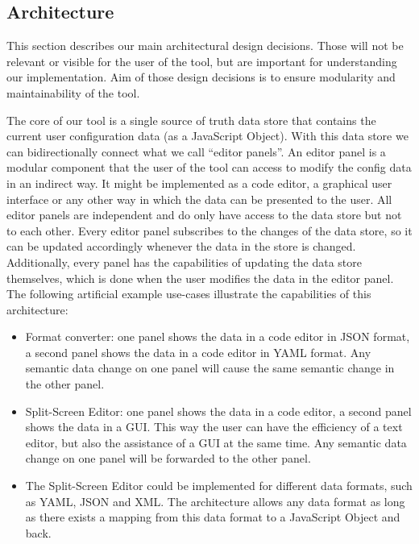 




\subsection{Architecture}\label{subsec:architecture} %
This section describes our main architectural design decisions.
Those will not be relevant or visible for the user of the tool, but are important for understanding our implementation.
Aim of those design decisions is to ensure modularity and maintainability of the tool.

The core of our tool is a single source of truth data store that contains the current user configuration data (as a JavaScript Object).
With this data store we can bidirectionally connect what we call ``editor panels''.
An editor panel is a modular component that the user of the tool can access to modify the config data in an indirect way.
It might be implemented as a code editor, a graphical user interface or any other way in which the data can be presented to the user.
All editor panels are independent and do only have access to the data store but not to each other.
Every editor panel subscribes to the changes of the data store, so it can be updated accordingly whenever the data in the store is changed.
Additionally, every panel has the capabilities of updating the data store themselves, which is done when the user modifies the data in the editor panel.
The following artificial example use-cases illustrate the capabilities of this architecture:

\begin{itemize}
    \item Format converter: one panel shows the data in a code editor in JSON format, a second panel shows the data in a code editor in YAML format. Any semantic data change on one panel will cause the same semantic change in the other panel.
    \item Split-Screen Editor: one panel shows the data in a code editor, a second panel shows the data in a GUI. This way the user can have the efficiency of a text editor, but also the assistance of a GUI at the same time. Any semantic data change on one panel will be forwarded to the other panel.
    \item The Split-Screen Editor could be implemented for different data formats, such as YAML, JSON and XML. The architecture allows any data format as long as there exists a mapping from this data format to a JavaScript Object and back.
\end{itemize}

